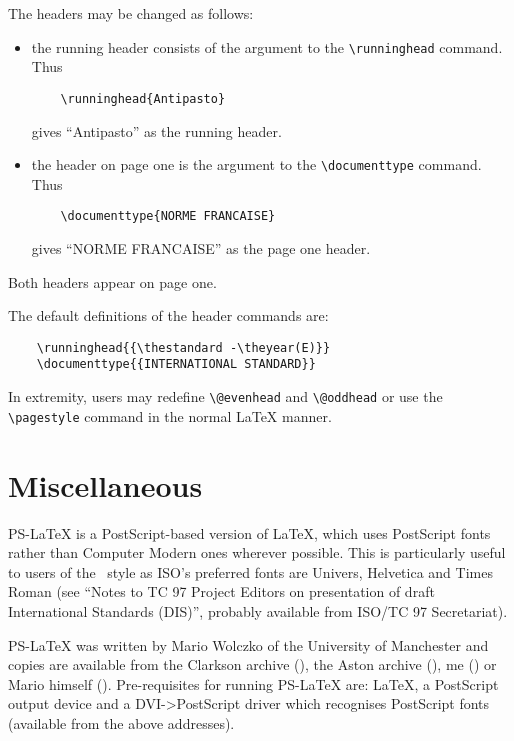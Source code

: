 The headers may be changed as follows:
\begin{itemize}
\item the running header consists of the argument to the
    \verb|\runninghead| command.
    Thus
    \begin{verbatim}
    \runninghead{Antipasto}
    \end{verbatim}
    gives ``Antipasto'' as the running header.
\item the header on page one is the argument to the
    \verb|\documenttype| command.
    Thus
    \begin{verbatim}
    \documenttype{NORME FRANCAISE}
    \end{verbatim}
    gives ``NORME FRANCAISE'' as the page one header.
\end{itemize}

\begin{notes}
\item Both headers appear on page one.
\item The default definitions of the header commands are:
    \begin{verbatim}
    \runninghead{{\thestandard -\theyear(E)}}
    \documenttype{{INTERNATIONAL STANDARD}}
    \end{verbatim}
\item In extremity, users may redefine
    \verb|\@evenhead| and \verb|\@oddhead| or use the \verb|\pagestyle|
    command in the normal LaTeX manner.
\end{notes}

\section{Miscellaneous}

PS-LaTeX is a PostScript-based version of LaTeX, which uses PostScript
fonts rather than Computer Modern ones wherever possible.
This is particularly useful to users of the \iso\ style as ISO's preferred
fonts are Univers, Helvetica and Times Roman (see ``Notes to TC 97 Project
Editors on presentation of draft International Standards (DIS)'', probably
available from ISO/TC 97 Secretariat).

PS-LaTeX was written by Mario Wolczko of the University of Manchester
and copies are available from
the Clarkson archive (),
the Aston archive (),
me () or 
Mario himself ().
Pre-requisites for running PS-LaTeX are: LaTeX, a PostScript output
device and a DVI->PostScript driver which recognises PostScript fonts
(available from the above addresses).

